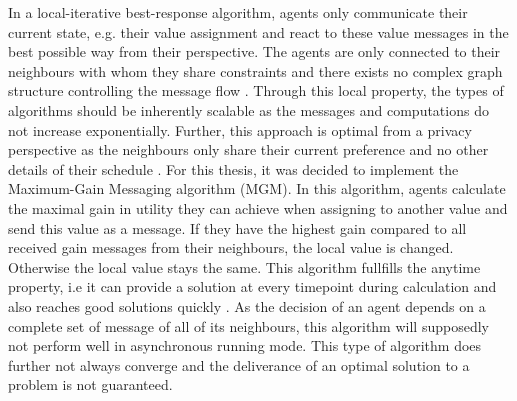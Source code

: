 In a local-iterative best-response algorithm, agents only communicate their current state, e.g. their value assignment and react to these value messages in the best possible way from their perspective. The agents are only connected to their neighbours with whom they share constraints and there exists no complex graph structure controlling the message flow \cite{Chapman2011}. Through this local property, the types of algorithms should be inherently scalable as the messages and computations do not increase exponentially. Further, this approach is optimal from a privacy perspective as the neighbours only share their current preference and no other details of their schedule \cite{Chapman2010}. %
\newline\newline
For this thesis, it was decided to implement the Maximum-Gain Messaging algorithm (MGM). In this algorithm, agents  calculate the maximal gain in utility they can achieve when assigning to another value and send this value as a message. If they have the highest gain compared to all received gain messages from their neighbours, the local value is changed. Otherwise the local value stays the same. This algorithm fullfills the anytime property, i.e it can provide a solution at every timepoint during calculation and also reaches good solutions quickly \cite{Chapman2010}. As the decision of an agent depends on a complete set of message of all of its neighbours, this algorithm will supposedly not perform well in asynchronous running mode. This type of algorithm does further not always converge and the deliverance of an optimal solution to a problem is not guaranteed.

